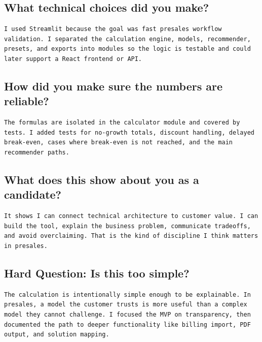 \documentclass[11pt,a4paper]{article}
\begin{document}
\subsection{What technical choices did you make?}

\begin{lstlisting}
I used Streamlit because the goal was fast presales workflow validation. I separated the calculation engine, models, recommender, presets, and exports into modules so the logic is testable and could later support a React frontend or API.
\end{lstlisting}

\subsection{How did you make sure the numbers are reliable?}

\begin{lstlisting}
The formulas are isolated in the calculator module and covered by tests. I added tests for no-growth totals, discount handling, delayed break-even, cases where break-even is not reached, and the main recommender paths.
\end{lstlisting}

\subsection{What does this show about you as a candidate?}

\begin{lstlisting}
It shows I can connect technical architecture to customer value. I can build the tool, explain the business problem, communicate tradeoffs, and avoid overclaiming. That is the kind of discipline I think matters in presales.
\end{lstlisting}

\subsection{Hard Question: Is this too simple?}

\begin{lstlisting}
The calculation is intentionally simple enough to be explainable. In presales, a model the customer trusts is more useful than a complex model they cannot challenge. I focused the MVP on transparency, then documented the path to deeper functionality like billing import, PDF output, and solution mapping.
\end{lstlisting}
\end{document}
